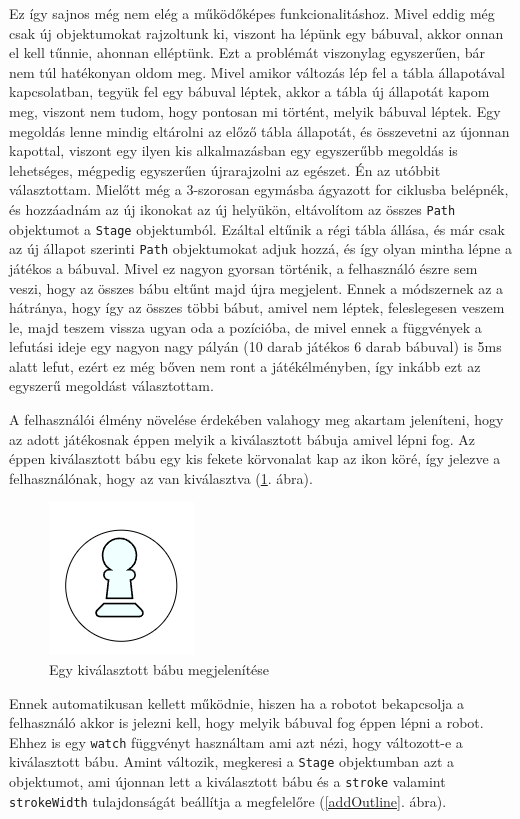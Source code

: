 \documentclass[a4paper,twoside]{article}
\begin{document}
Ez így sajnos még nem elég a működőképes funkcionalitáshoz. Mivel eddig még csak új objektumokat rajzoltunk ki, viszont ha lépünk egy bábuval, akkor onnan el kell tűnnie, ahonnan elléptünk. Ezt a problémát viszonylag egyszerűen, bár nem túl hatékonyan oldom meg. Mivel amikor változás lép fel a tábla állapotával kapcsolatban, tegyük fel egy bábuval léptek, akkor a tábla új állapotát kapom meg, viszont nem tudom, hogy pontosan mi történt, melyik bábuval léptek. Egy megoldás lenne mindig eltárolni az előző tábla állapotát, és összevetni az újonnan kapottal, viszont egy ilyen kis alkalmazásban egy egyszerűbb megoldás is lehetséges, mégpedig egyszerűen újrarajzolni az egészet. Én az utóbbit választottam. Mielőtt még a 3-szorosan egymásba ágyazott for ciklusba belépnék, és hozzáadnám az új ikonokat az új helyükön, eltávolítom az összes \verb|Path| objektumot a \verb|Stage| objektumból. Ezáltal eltűnik a régi tábla állása, és már csak az új állapot szerinti \verb|Path| objektumokat adjuk hozzá, és így olyan mintha lépne a játékos a bábuval. Mivel ez nagyon gyorsan történik, a felhasználó észre sem veszi, hogy az összes bábu eltűnt majd újra megjelent. Ennek a módszernek az a hátránya, hogy így az összes többi bábut, amivel nem léptek, feleslegesen veszem le, majd teszem vissza ugyan oda a pozícióba, de mivel ennek a függvények a lefutási ideje egy nagyon nagy pályán (10 darab játékos 6 darab bábuval) is 5ms alatt lefut, ezért ez még bőven nem ront a játékélményben, így inkább ezt az egyszerű megoldást választottam. 

A felhasználói élmény növelése érdekében valahogy meg akartam jeleníteni, hogy az adott játékosnak éppen melyik a kiválasztott bábuja amivel lépni fog. Az éppen kiválasztott bábu egy kis fekete körvonalat kap az ikon köré, így jelezve a felhasználónak, hogy az van kiválasztva (\ref{babu}. ábra).
\begin{figure}
	\caption{Egy kiválasztott bábu megjelenítése}
	\label{babu}
	\centering
	\includegraphics[scale=0.5]{babu}
\end{figure}
\FloatBarrier

 Ennek automatikusan kellett működnie, hiszen ha a robotot bekapcsolja a felhasználó akkor is jelezni kell, hogy melyik bábuval fog éppen lépni a robot. Ehhez is egy \verb|watch| függvényt használtam ami azt nézi, hogy változott-e  a kiválasztott bábu. Amint változik, megkeresi a \verb|Stage| objektumban azt a objektumot, ami újonnan lett a kiválasztott bábu és a \verb|stroke| valamint \verb|strokeWidth| tulajdonságát beállítja a megfelelőre (\ref{addOutline}. ábra).
\end{document}
